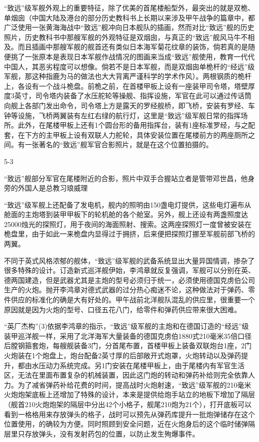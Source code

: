\documentclass[12pt,UTF8]{ctexbook}
\begin{document}
“致远”级军舰外观上的重要特征，除了优美的首尾楼船型外，最突出的就是双桅、单烟囱（中国大陆及港台的部分历史教科书上长期以来涉及甲午战争的篇章中，都广泛使用一张黄海海战中“致远”舰冲向日本舰队的插画，然而对比“致远”舰的历史照片，历史教科书中那艘军舰的外观特征是双烟囱，与真正的“致远”舰风马牛不相及。而且插画中那艘军舰的舰首还有类似日本海军菊花纹章的装饰，倘若真的是随便挑了一张原本是表现日本军舰作战情况的图画来当成“致远”舰使用，教育一代代中国人，其恶劣程度可以想像。倘若不是日本军舰，而是双烟囱单桅杆的“经远”级军舰，那这种指鹿为马的做法也大大背离严谨科学的学术作风）。两根钢质的桅杆上，各设有一个战斗桅盘。前桅之前，在首楼甲板上设有一座装甲司令塔，塔壁厚度3英寸，司令塔内装备了水压舵轮等操舰、指挥设施，军官在此可以通过传话筒向舰上各部门发出命令，司令塔上方是露天的罗经舰桥，即飞桥，安装有罗经、车钟等设施，飞桥两翼装有左红右绿的航行灯，这里是“致远”级军舰日常的指挥场所。此外，在尾楼甲板上还有1个圆台形的备用指挥台，装有1座标准罗经，与之配套，在下方的主甲板上设有双联人力舵轮，具体安装位置在尾楼前方的两座厕所之间。有一张著名的“致远”舰军官合影照片，就是在这个位置拍摄的。

5-3

“致远”舰部分军官在尾楼附近的合影，照片中双手合握站立者是管带邓世昌，他身旁的外国人是总教习琅威理

“致远”级军舰上还配备了发电机，舰内的照明由150盏电灯提供，这些电灯遍布从舱面的主炮塔到装甲甲板下的轮机舱的各个舱室。另外，舰上还设有两盏照度达25000烛光的探照灯，用于夜间的海面照射、搜索。这两座探照灯一度曾被安装在桅盘里，由于如此一来桅盘内显得过于拥挤，后来便把探照灯挪至军舰前部飞桥的两翼。

不同于英式风格浓郁的舰体，“致远”级军舰的武备系统显出大量异国情调，掺杂了很多特殊的设计。订造新式巡洋舰伊始，李鸿章就反复强调，军舰可以分别在英、德两国建造，但是武器尤其是主炮的型号必须归于统一，必须使用德国克虏伯公司生产的火炮。抛开李鸿章对德式武器的过分热心痴迷不论，这种做法对于弹药、零件供应的标准化的确是大有好处的。甲午战前北洋舰队混乱的供应里，很重要一个原因就是因为火炮的型号、口径五花八门，给零件和弹药供应带来很大困难。

“英厂杰构”(3)依据李鸿章的指示，“致远”级军舰的主炮和在德国订造的“经远”级装甲巡洋舰一样，采用了北洋海军大量装备的德国克虏伯1880式210毫米35倍口径后膛钢箍套炮，每艘舰装备3门，分首尾布置，首楼甲板上装备双联炮台1座，2门火炮装在1个炮盘上，炮台配备2英寸厚的后部敞开式炮罩，火炮转动以及弹药提升，都由水压动力系统完成。另1门安装在尾楼甲板上，由于尾楼内有军官生活区，无法在里面布置复杂的机械装置，因此这门炮的转动和弹药补给则完全依靠人力。为了减省弹药补给花费的时间，提高战时火炮射速，“致远”级军舰的210毫米火炮炮架底板上还增加了特殊的设计，本来是提供给炮手站立的地板下增加了隔层（舰首210火炮炮架的隔层中分出42个小格子，舰尾210炮为21个），打开底板可以看到一格格用来存放弹头的格子，战时可以预先从弹药库提升一批炮弹储存在这个位置使用，的确较为方便。同时照顾到安全问题，近在火炮身后的这个临时储弹隔层里只存放弹头，没有发射药包的位置，以防止发生殉爆事件。
\end{document}
